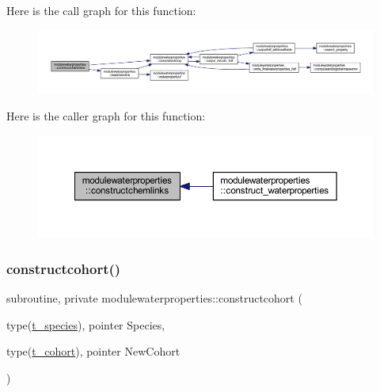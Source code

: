Here is the call graph for this function\+:\nopagebreak
\begin{figure}[H]
\begin{center}
\leavevmode
\includegraphics[width=350pt]{namespacemodulewaterproperties_aac68ff898a933da27b109068c70a5f15_cgraph}
\end{center}
\end{figure}
Here is the caller graph for this function\+:\nopagebreak
\begin{figure}[H]
\begin{center}
\leavevmode
\includegraphics[width=350pt]{namespacemodulewaterproperties_aac68ff898a933da27b109068c70a5f15_icgraph}
\end{center}
\end{figure}
\mbox{\label{namespacemodulewaterproperties_ae8f037a58e95e5182b8c0d4b073ad271}} 
\subsubsection{\texorpdfstring{constructcohort()}{constructcohort()}}
{\footnotesize\ttfamily subroutine, private modulewaterproperties\+::constructcohort (\begin{DoxyParamCaption}\item[{type(\mbox{\hyperlink{structmodulewaterproperties_1_1t__species}{t\+\_\+species}}), pointer}]{Species,  }\item[{type(\mbox{\hyperlink{structmodulewaterproperties_1_1t__cohort}{t\+\_\+cohort}}), pointer}]{New\+Cohort }\end{DoxyParamCaption})\hspace{0.3cm}{\ttfamily [private]}}


